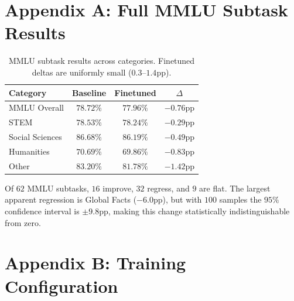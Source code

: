\documentclass{article}
\begin{document}



\appendix

\section{Appendix A: Full MMLU Subtask Results}

\begin{table}[t]
\caption{MMLU subtask results across categories. Finetuned deltas are uniformly small ($0.3$--$1.4$pp).}
\label{tab:mmlu_full}
\begin{center}
\begin{tabular}{lccc}
\toprule
Category & Baseline & Finetuned & $\Delta$ \\
\midrule
MMLU Overall & $78.72\%$ & $77.96\%$ & $-0.76$pp \\
STEM & $78.53\%$ & $78.24\%$ & $-0.29$pp \\
Social Sciences & $86.68\%$ & $86.19\%$ & $-0.49$pp \\
Humanities & $70.69\%$ & $69.86\%$ & $-0.83$pp \\
Other & $83.20\%$ & $81.78\%$ & $-1.42$pp \\
\bottomrule
\end{tabular}
\end{center}
\end{table}

Of $62$ MMLU subtasks, $16$ improve, $32$ regress, and $9$ are flat. The largest apparent regression is Global Facts ($-6.0$pp), but with $100$ samples the $95\%$ confidence interval is $\pm9.8$pp, making this change statistically indistinguishable from zero.

\section{Appendix B: Training Configuration}
\end{document}
